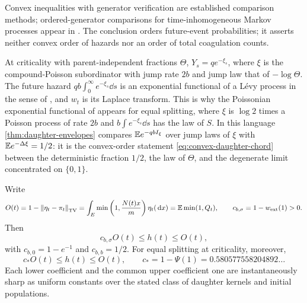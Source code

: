 Convex inequalities with generator verification are established
comparison methods; ordered-generator comparisons for
time-inhomogeneous Markov processes appear in
\citet{RuschendorfSchnurrWolf2016}. The conclusion orders future-event
probabilities; it asserts neither convex order of hazards nor an
order of total coagulation counts.

\begin{remark}
\label{rem:exponential-functional}
At criticality with parent-independent fractions $\Theta$,
$Y_s=qe^{-\xi_s}$, where $\xi$ is the compound-Poisson subordinator
with jump rate $2b$ and jump law that of $-\log\Theta$. The future
hazard $qb\int_0^\infty e^{-\xi_s}\dd s$ is an exponential functional
of a L\'evy process in the sense of \citet{BertoinYor2005}, and $w_t$
is its Laplace transform. This is why the Poissonian exponential
functional of \citet{BertoinBianeYor2004} appears for equal
splitting, where $\xi$ is $\log2$ times a Poisson process of rate
$2b$ and $b\int e^{-\xi_s}\dd s$ has the law of $S$. In this language
\cref{thm:daughter-envelopes} compares $\mathbb E e^{-qbI_\xi}$ over jump
laws of $\xi$ with $\mathbb E e^{-\Delta\xi}=1/2$: it is the convex-order
statement \eqref{eq:convex-daughter-chord} between the deterministic
fraction $1/2$, the law of $\Theta$, and the degenerate limit
concentrated on $\{0,1\}$.
\end{remark}

\begin{corollary}
\label{cor:overlap-all-rates}
Write
\begin{equation}
 O(t)=1-\left\lVert \eta_t-\pi_t\right\rVert_{\mathrm{TV}}
     =\int_E\min\left(1,\frac{N(t)x}m\right)\eta_t(\,\mathrm d x)
     =\mathbb E\min(1,Q_t),\qquad
 c_{b,\sigma}=1-w_{\rm ext}(1)>0.
 \label{eq:overlap-last-def}
\end{equation}
Then
\begin{equation}
 c_{b,\sigma}O(t)\leq h(t)\leq O(t),
 \label{eq:overlap-all-rates}
\end{equation}
with $c_{b,0}=1-e^{-1}$ and $c_{b,b}=1/2$. For equal splitting at
criticality, moreover,
\begin{equation}
 c_*O(t)\leq h(t)\leq O(t),\qquad
 c_*=1-\Psi(1)=0.580577558204892\ldots
 \label{eq:equal-overlap}
\end{equation}
Each lower coefficient and the common upper coefficient one are
instantaneously sharp as uniform constants over the stated class of
daughter kernels and initial populations.
\end{corollary}

